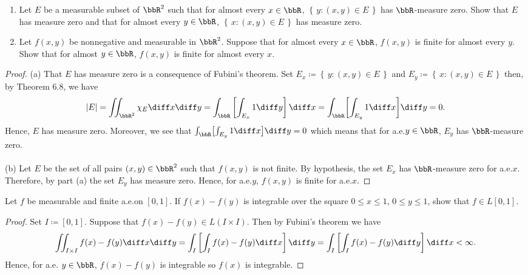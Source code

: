 
\begin{problem}
\begin{enumerate}[label=(\alph*)]
\item Let $E$ be a measurable subset of $\bbR^2$ such that for almost every
  $x\in\bbR$, $\left\{\,y:(x,y)\in E\,\right\}$ has
  $\bbR$-measure zero. Show that $E$ has measure zero and that for almost
  every $y\in\bbR$, $\left\{\,x:(x,y)\in E\,\right\}$ has
  measure zero.
\item Let $f(x,y)$ be nonnegative and measurable in $\bbR^2$. Suppose that
  for almost every $x\in\bbR$, $f(x,y)$ is finite for almost every
  $y$. Show that for almost $y\in\bbR$, $f(x,y)$ is finite for almost
  every $x$.
\end{enumerate}
\end{problem}
\begin{proof}
(a) That $E$ has measure zero is a consequence of Fubini's theorem. Set
$E_x\coloneqq\left\{\,y:(x,y)\in E\,\right\}$ and
$E_y\coloneqq\left\{\,x:(x,y)\in E\,\right\}$ then, by Theorem 6.8, we have
\begin{equation}
\label{eq:consequence-of-fubini}
|E|=
\iint_{\bbR^2}\chi_E\diff x\diff y=
\int_\bbR\left[\int_{E_x}1\diff y\right]\diff x=
\int_\bbR\biggl[\int_{E_y}1\diff x\biggr]\diff y=
0.
\end{equation}
Hence, $E$ has measure zero. Moreover, we see that
$\int_\bbR\bigl[\int_{E_y}1\diff x\bigr]\diff y=0$ which means that for
a.e.\@ $y\in\bbR$, $E_y$ has $\bbR$-measure zero.
\\\\
(b) Let $E$ be the set of all pairs $(x,y)\in\bbR^2$ such that $f(x,y)$ is
not finite. By hypothesis, the set $E_x$ has $\bbR$-measure zero for
a.e.\@ $x$. Therefore, by part (a) the set $E_y$ has measure zero. Hence,
for a.e.\@ $y$, $f(x,y)$ is finite for a.e.\@ $x$.
\end{proof}
\newpage

\begin{problem}
Let $f$ be measurable and finite a.e.\@ on $[0,1]$. If $f(x)-f(y)$ is
integrable over the square $0\leq x\leq 1$, $0\leq y\leq 1$, show that
$f\in L[0,1]$.
\end{problem}
\begin{proof}
Set $I\coloneqq[0,1]$. Suppose that $f(x)-f(y)\in L(I\times I)$. Then by
Fubini's theorem we have
\begin{equation}
  \label{eq:double-integral}
\iint_{I\times I}f(x)-f(y)\diff x\diff y=
\int_I\left[\int_I f(x)-f(y)\diff x\right]\diff y=
\int_I\left[\int_I f(x)-f(y)\diff y\right]\diff x<\infty.
\end{equation}
Hence, for a.e. $y\in\bbR$, $f(x)-f(y)$ is integrable so $f(x)$ is
integrable.
\end{proof}
\newpage

